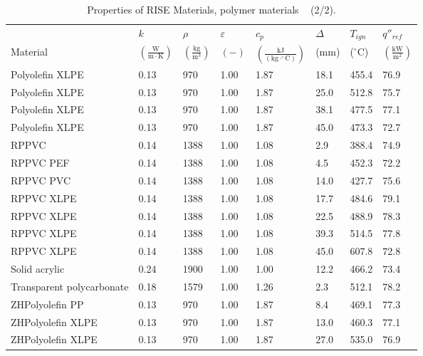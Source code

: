 \begin{table}[!h]
\caption[Properties of RISE Materials, polymer materials]{Properties of RISE Materials, polymer materials ~\cite{RISE:Fire_Database} (2/2).}
\centering
\begin{tabular}{|p{5.5cm}|p{1.0cm}|p{1.0cm}|p{0.8cm}|p{1.4cm}|p{1.0cm}|p{1.0cm}|p{1.2cm}|}
\hline
                                               & $k$    & $\rho$      & $\varepsilon$   & $c_{p}$ & $\Delta$    & $T_{ign}$ & $q''_{ref}$ \\
Material                                       & $\mathrm{\left(\frac{W}{m\cdot K}\right)}$ & $\mathrm{\left(\frac{kg}{m^{3}}\right)}$ & $\mathrm{( - )}$ & $\mathrm{\left(\frac{kJ}{(kg\cdot ^{\circ}C)}\right)}$ &  ($\mathrm{mm}$)   & ($\mathrm{^{\circ}C}$) & $\mathrm{\left(\frac{kW}{m^{2}}\right)}$ \\ \hline
\hline
Polyolefin XLPE & 0.13 & 970 & 1.00 & 1.87 & 18.1 & 455.4 & 76.9 \\ \hline
Polyolefin XLPE & 0.13 & 970 & 1.00 & 1.87 & 25.0 & 512.8 & 75.7 \\ \hline
Polyolefin XLPE & 0.13 & 970 & 1.00 & 1.87 & 38.1 & 477.5 & 77.1 \\ \hline
Polyolefin XLPE & 0.13 & 970 & 1.00 & 1.87 & 45.0 & 473.3 & 72.7 \\ \hline
RPPVC & 0.14 & 1388 & 1.00 & 1.08 & 2.9 & 388.4 & 74.9 \\ \hline
RPPVC PEF & 0.14 & 1388 & 1.00 & 1.08 & 4.5 & 452.3 & 72.2 \\ \hline
RPPVC PVC & 0.14 & 1388 & 1.00 & 1.08 & 14.0 & 427.7 & 75.6 \\ \hline
RPPVC XLPE & 0.14 & 1388 & 1.00 & 1.08 & 17.7 & 484.6 & 79.1 \\ \hline
RPPVC XLPE & 0.14 & 1388 & 1.00 & 1.08 & 22.5 & 488.9 & 78.3 \\ \hline
RPPVC XLPE & 0.14 & 1388 & 1.00 & 1.08 & 39.3 & 514.5 & 77.8 \\ \hline
RPPVC XLPE & 0.14 & 1388 & 1.00 & 1.08 & 45.0 & 607.8 & 72.8 \\ \hline
Solid acrylic & 0.24 & 1900 & 1.00 & 1.00 & 12.2 & 466.2 & 73.4 \\ \hline
Transparent polycarbonate & 0.18 & 1579 & 1.00 & 1.26 & 2.3 & 512.1 & 78.2 \\ \hline
ZHPolyolefin PP & 0.13 & 970 & 1.00 & 1.87 & 8.4 & 469.1 & 77.3 \\ \hline
ZHPolyolefin XLPE & 0.13 & 970 & 1.00 & 1.87 & 13.0 & 460.3 & 77.1 \\ \hline
ZHPolyolefin XLPE & 0.13 & 970 & 1.00 & 1.87 & 27.0 & 535.0 & 76.9 \\ \hline
\end{tabular}
\label{Properties_RISE_Materials_polymers2}
\end{table}

